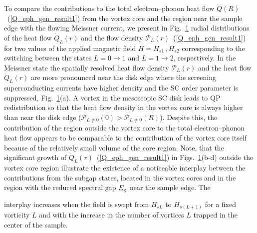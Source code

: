 \documentclass[prx,twocolumn,aps,superscriptaddress,showpacs,amsmath,amssymb,footnoteinbib]{revtex4-1}
\begin{document}
To compare the contributions to the total electron--phonon heat
flow $\dot{Q}(R)$~(\ref{Q_eph_gen_result1}) from the vortex core
and the region near the sample edge with the flowing Meissner
current, we present in Fig.~\ref{Fig-PQ} radial distributions of
the heat flow $\dot{Q}_L(r)$ and the flow density
$\mathcal{P}_L(r)$~(\ref{Q_eph_gen_result1}) for two values of the
applied magnetic field $H = H_{s1}\,,H_{s2}$ corresponding to the
switching between the states $L=0 \to 1$ and $L=1 \to 2$,
respectively. In the Meissner state the spatially resolved heat
flow density $\mathcal{P}_L(r)$ and the heat flow $\dot{Q}_L(r)$
are more pronounced near the disk edge where the screening
superconducting currents have higher density and the SC order
parameter is suppressed, Fig.~\ref{Fig-PQ}(a). A vortex in the
mesoscopic SC disk leads to QP redistribution so that the heat
flow density in the vortex core is always higher than near the
disk edge ($\mathcal{P}_{L \ne 0}(0) > \mathcal{P}_{L \ne 0}(R)$).
Despite this, the contribution of the region outside the vortex
core to the total electron--phonon heat flow appears to be
comparable to the contribution of the vortex core itself because
of the relatively small volume of the core region. Note, that the
significant growth of $\dot{Q}_L(r)$~(\ref{Q_eph_gen_result1}) in
Figs.~\ref{Fig-PQ}(b-d) outside the vortex core region illustrate
the existence of a noticeable interplay between the contributions
from  the subgap states, located in the vortex cores and in the
region with the reduced spectral gap $E_{\rm g}$ near the sample
edge. The
%
\onecolumngrid
\begin{figure*}[t!]
\label{Fig-PQ}
\end{figure*}
\newpage
\twocolumngrid
%
\noindent
interplay increases when the field is swept from
$H_{sL}$ to $H_{s(L+1)}$ for a fixed vorticity $L$ and with the
increase in the number of vortices $L$ trapped in the center of
the sample.
\end{document}
